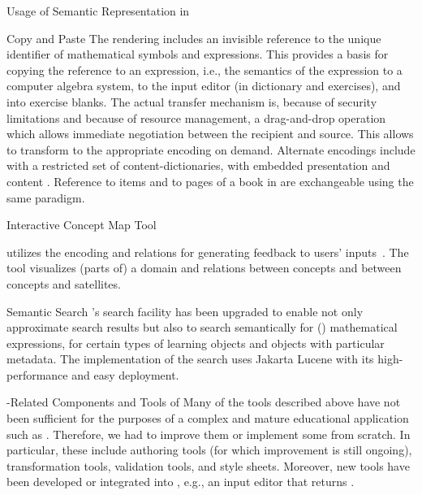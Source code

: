 \begin{omgroup}[id=activemath,short=ActiveMath,
  creators={melis,goguadse,alberto,frischauf,homik,libbrecht,cullrich}]
\begin{omgroup}{Usage of Semantic Representation in {\activemath}}
\begin{omgroup}{Copy and Paste}
The rendering includes an invisible reference to the unique identifier of mathematical
symbols and expressions. This provides a basis for copying the reference to an {\openmath}
expression, i.e., the semantics of the expression to a computer algebra system, to the
input editor (in dictionary and exercises), and into exercise blanks.
The actual transfer mechanism is, because of security limitations and
because of resource management, a drag-and-drop operation which allows
immediate negotiation between the recipient and source. This allows
to transform to the appropriate encoding on demand.
Alternate encodings include {\openmath} with a restricted set of content-dictionaries, 
{\html} with embedded presentation and content {\mathml}.
Reference to {\omdoc} items and to pages of a book in {\activemath} are
exchangeable using the same paradigm.
\end{omgroup}
\begin{omgroup}{Interactive Concept Map Tool {}}

{} utilizes the {\omdoc} encoding and relations for generating feedback to
users' inputs~\cite{MelisKaergerHomikcmapDelphi05}. The tool visualizes (parts of) a
domain and relations between concepts and between concepts and satellites.
\end{omgroup}

\begin{omgroup}{Semantic Search}
{\activemath}'s search facility has been upgraded to enable not only approximate search
results but also to search semantically for ({\openmath}) mathematical expressions, for
certain types of learning objects and objects with particular metadata.
The implementation of the search uses Jakarta Lucene with its high-performance
and easy deployment.
\end{omgroup}

\begin{omgroup}{{\omdoc}-Related Components and Tools of {\activemath}}
Many of the tools described above have not been sufficient for the purposes of a complex
and mature educational application such as {\activemath}.  Therefore, we had to improve
them or implement some from scratch. In particular, these include authoring tools (for
which improvement is still ongoing), transformation tools, validation tools, and
style sheets. Moreover, new tools have been developed or integrated into {\activemath},
e.g., an input editor that returns {\openmath}.


\end{omgroup}
\end{omgroup}
\end{omgroup}
